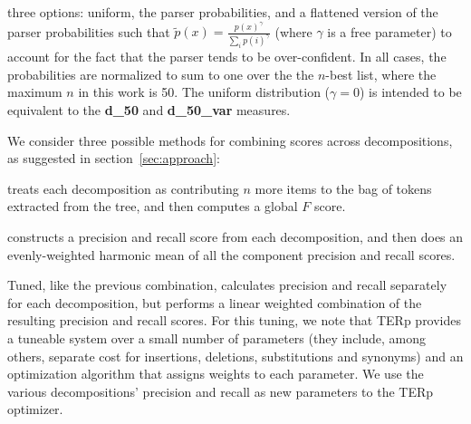 \documentclass{kluwer}    %
\begin{document}
\begin{article}
\begin{description}
  three options: uniform, the parser probabilities, and a flattened
  version of the parser probabilities such that $\tilde{p}(x) =
  \frac{p(x)^\gamma}{\sum_ip(i)^\gamma}$ (where $\gamma$ is a free
  parameter) to account for the fact that the parser tends to be
  over-confident.  In all cases, the probabilities are normalized to
  sum to one over the the $n$-best list, where the maximum $n$ in this
  work is 50.  The uniform distribution ($\gamma = 0$) is intended to
  be equivalent to the \cite{owczarzak07labelleddepseval}
  \textbf{d\_50} and \textbf{d\_50\_var} measures.
\item[Score combination.] We consider three possible methods for
  combining scores across decompositions, as suggested in
  section~\ref{sec:approach}:
  \begin{description}
  \item[$F\lbrack\cdot\rbrack$] treats each decomposition as
    contributing $n$ more items to the bag of tokens extracted from
    the tree, and then computes a global $F$ score.
  \item[$\mu_{PR}\lbrack\cdot\rbrack$] constructs a precision and
    recall score from each decomposition, and then does an
    evenly-weighted harmonic mean of all the component precision and
    recall scores.
  \item Tuned, like the previous combination, calculates precision and
    recall separately for each decomposition, but performs a linear
    weighted combination of the resulting precision and recall scores.
    For this tuning, we note that TERp \cite{snover09terp} provides a
    tuneable system over a small number of parameters (they include,
    among others, separate cost for insertions, deletions,
    substitutions and synonyms) and an optimization algorithm that
    assigns weights to each parameter. We use the various
    decompositions' precision and recall as new parameters to the TERp
    optimizer.
  \end{description}
\end{description}


\end{article}
\end{document}
